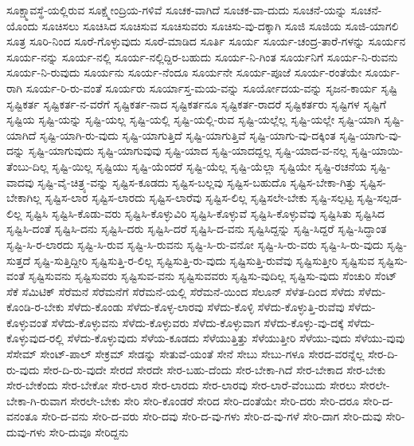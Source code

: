 {ಸೂಕ್ಷ್ಮಾವಸ್ಥೆ-ಯಲ್ಲಿರುವ
ಸೂಕ್ಷ್ಮೇಂದ್ರಿಯ-ಗಳಿವೆ
ಸೂಚಕ-ವಾಗಿದೆ
ಸೂಚಕ-ವಾ-ದುದು
ಸೂಚನೆ-ಯನ್ನು
ಸೂಚನೆ-ಯೊಂದು
ಸೂಚಿಸಲು
ಸೂಚಿಸಿದ
ಸೂಚಿಸುವ
ಸೂಚಿಸುವರು
ಸೂಚಿಸು-ವು-ದಕ್ಕಾಗಿ
ಸೂಜಿ
ಸೂಜಿಯ
ಸೂಜಿ-ಯಾಗಲಿ
ಸೂತ್ರ
ಸೂರಿ-ನಿಂದ
ಸೂರೆ-ಗೊಳ್ಳುವುದು
ಸೂರೆ-ಮಾಡಿದ
ಸೂರ್ತಿ
ಸೂರ್ಯ
ಸೂರ್ಯ-ಚಂದ್ರ-ತಾರೆ-ಗಳನ್ನು
ಸೂರ್ಯನ
ಸೂರ್ಯ-ನನ್ನು
ಸೂರ್ಯ-ನಲ್ಲಿ
ಸೂರ್ಯ-ನಲ್ಲಿದ್ದಿರ-ಬಹುದು
ಸೂರ್ಯ-ನಿ-ಗಿಂತ
ಸೂರ್ಯನಿಗೆ
ಸೂರ್ಯ-ನಿ-ರುವನು
ಸೂರ್ಯ-ನಿ-ರುವುದು
ಸೂರ್ಯನು
ಸೂರ್ಯ-ನೆಂದೂ
ಸೂರ್ಯನೇ
ಸೂರ್ಯ-ಪೂಜೆ
ಸೂರ್ಯ-ರಂತೆಯೇ
ಸೂರ್ಯ-ರಾಗಿ
ಸೂರ್ಯ-ರಿ-ರು-ವಂತೆ
ಸೂರ್ಯರು
ಸೂರ್ಯಾಸ್ತ-ಮಯ-ವನ್ನು
ಸೂರ್ಯೋದಯ-ವನ್ನು
ಸೃಜನ-ಕಾರ್ಯ
ಸೃಷ್ಟಿ
ಸೃಷ್ಟಿಕರ್ತ
ಸೃಷ್ಟಿಕರ್ತ-ನ-ವರೆಗೆ
ಸೃಷ್ಟಿಕರ್ತ-ನಾದ
ಸೃಷ್ಟಿಕರ್ತನೂ
ಸೃಷ್ಟಿಕರ್ತ-ರಾದರೆ
ಸೃಷ್ಟಿಕರ್ತರು
ಸೃಷ್ಟಿಗಳ
ಸೃಷ್ಟಿಗೆ
ಸೃಷ್ಟಿಯ
ಸೃಷ್ಟಿ-ಯನ್ನು
ಸೃಷ್ಟಿ-ಯಲ್ಲ
ಸೃಷ್ಟಿ-ಯಲ್ಲಿ
ಸೃಷ್ಟಿ-ಯಲ್ಲಿ-ರುವ
ಸೃಷ್ಟಿ-ಯಲ್ಲೆಲ್ಲ
ಸೃಷ್ಟಿ-ಯಲ್ಲೇ
ಸೃಷ್ಟಿ-ಯಾಗಿ
ಸೃಷ್ಟಿ-ಯಾಗಿದೆ
ಸೃಷ್ಟಿ-ಯಾಗಿ-ರು-ವುದು
ಸೃಷ್ಟಿ-ಯಾಗುತ್ತಿದೆ
ಸೃಷ್ಟಿ-ಯಾಗುತ್ತಿವೆ
ಸೃಷ್ಟಿ-ಯಾಗು-ವು-ದಕ್ಕಿಂತ
ಸೃಷ್ಟಿ-ಯಾಗು-ವು-ದನ್ನು
ಸೃಷ್ಟಿ-ಯಾಗುವುದು
ಸೃಷ್ಟಿ-ಯಾಗುವುವು
ಸೃಷ್ಟಿ-ಯಾದ
ಸೃಷ್ಟಿ-ಯಾದದ್ದಲ್ಲ
ಸೃಷ್ಟಿ-ಯಾದ-ವ-ನಲ್ಲ
ಸೃಷ್ಟಿ-ಯಾಯಿ-ತೆಂಬು-ದಿಲ್ಲ
ಸೃಷ್ಟಿ-ಯಿಲ್ಲ
ಸೃಷ್ಟಿಯು
ಸೃಷ್ಟಿ-ಯೆಂದರೆ
ಸೃಷ್ಟಿ-ಯೆಲ್ಲ
ಸೃಷ್ಟಿ-ಯೆಲ್ಲಾ
ಸೃಷ್ಟಿಯೇ
ಸೃಷ್ಟಿ-ರಚನೆಯ
ಸೃಷ್ಟಿ-ವಾದವು
ಸೃಷ್ಟಿ-ವೈ-ಚಿತ್ರ್ಯ-ವನ್ನು
ಸೃಷ್ಟಿಸ-ಕೂಡದು
ಸೃಷ್ಟಿಸ-ಬಲ್ಲವು
ಸೃಷ್ಟಿಸ-ಬಹುದೊ
ಸೃಷ್ಟಿಸ-ಬೇಕಾ-ಗಿತ್ತು
ಸೃಷ್ಟಿಸ-ಬೇಕಾಗಿಲ್ಲ
ಸೃಷ್ಟಿಸ-ಲಾರ
ಸೃಷ್ಟಿಸ-ಲಾರದು
ಸೃಷ್ಟಿಸ-ಲಾರೆವು
ಸೃಷ್ಟಿಸ-ಲಿಲ್ಲ
ಸೃಷ್ಟಿಸಲೇ-ಬೇಕು
ಸೃಷ್ಟಿ-ಸಲ್ಪಟ್ಟ
ಸೃಷ್ಟಿ-ಸಲ್ಪಡ-ಲಿಲ್ಲ
ಸೃಷ್ಟಿಸಿ
ಸೃಷ್ಟಿಸಿ-ಕೊಡು-ವರು
ಸೃಷ್ಟಿಸಿ-ಕೊಳ್ಳುವಿರಿ
ಸೃಷ್ಟಿಸಿ-ಕೊಳ್ಳುವೆ
ಸೃಷ್ಟಿಸಿ-ಕೊಳ್ಳುವೆವು
ಸೃಷ್ಟಿಸಿತು
ಸೃಷ್ಟಿಸಿದ
ಸೃಷ್ಟಿಸಿ-ದಂತೆ
ಸೃಷ್ಟಿಸಿ-ದನು
ಸೃಷ್ಟಿಸಿ-ದರು
ಸೃಷ್ಟಿಸಿ-ದರೆ
ಸೃಷ್ಟಿಸಿ-ದ-ವನು
ಸೃಷ್ಟಿಸಿದ್ದನ್ನು
ಸೃಷ್ಟಿ-ಸಿದ್ದರೆ
ಸೃಷ್ಟಿ-ಸಿದ್ಧಾಂತ
ಸೃಷ್ಟಿ-ಸಿ-ರ-ಲಾರದು
ಸೃಷ್ಟಿ-ಸಿ-ರುವ
ಸೃಷ್ಟಿ-ಸಿ-ರುವನು
ಸೃಷ್ಟಿ-ಸಿ-ರು-ವನೋ
ಸೃಷ್ಟಿ-ಸಿ-ರು-ವರು
ಸೃಷ್ಟಿ-ಸಿ-ರು-ವುದು
ಸೃಷ್ಟಿ-ಸುತ್ತದೆ
ಸೃಷ್ಟಿ-ಸುತ್ತಿದ್ದೀರಿ
ಸೃಷ್ಟಿಸುತ್ತಿ-ರ-ಲಿಲ್ಲ
ಸೃಷ್ಟಿಸುತ್ತಿ-ರು-ವುದು
ಸೃಷ್ಟಿಸುತ್ತಿ-ರುವೆವು
ಸೃಷ್ಟಿಸುತ್ತೀರಿ
ಸೃಷ್ಟಿಸುವ
ಸೃಷ್ಟಿಸು-ವಂತೆ
ಸೃಷ್ಟಿಸುವನು
ಸೃಷ್ಟಿಸುವರು
ಸೃಷ್ಟಿಸುವ-ವನು
ಸೃಷ್ಟಿಸುವವರು
ಸೃಷ್ಟಿಸು-ವುದಿಲ್ಲ
ಸೃಷ್ಟಿಸು-ವುದು
ಸೆಂಚುರಿ
ಸೆಂಟ್
ಸೆಕೆ
ಸೆಮಿಟಿಕ್
ಸೆರೆಮನೆ
ಸೆರೆಮನೆಗೆ
ಸೆರೆಮನೆ-ಯಲ್ಲಿ
ಸೆರೆಮನೆ-ಯಿಂದ
ಸೆಲೂನ್
ಸೆಳೆತ-ದಿಂದ
ಸೆಳೆದು
ಸೆಳೆದು-ಕೊಂಡಿ-ರ-ಬೇಕು
ಸೆಳೆದು-ಕೊಂಡು
ಸೆಳೆದು-ಕೊಳ್ಳ-ಲಾರವು
ಸೆಳೆದು-ಕೊಳ್ಳಿ
ಸೆಳೆದು-ಕೊಳ್ಳುತ್ತಿ-ರುವೆವು
ಸೆಳೆದು-ಕೊಳ್ಳುವಂತೆ
ಸೆಳೆದು-ಕೊಳ್ಳುವನು
ಸೆಳೆದು-ಕೊಳ್ಳುವರು
ಸೆಳೆದು-ಕೊಳ್ಳುವಾಗ
ಸೆಳೆದು-ಕೊಳ್ಳು-ವು-ದಕ್ಕೆ
ಸೆಳೆದು-ಕೊಳ್ಳುವುದ-ರಲ್ಲಿ
ಸೆಳೆದು-ಕೊಳ್ಳುವುದು
ಸೆಳೆಯ-ಕೂಡದು
ಸೆಳೆಯುತ್ತಿತ್ತು
ಸೆಳೆಯುತ್ತೀರಿ
ಸೆಳೆಯು-ವುದು
ಸೆಳೆಯು-ವುವು
ಸೆಸೇಮ್
ಸೇಂಟ್-ಪಾಲ್
ಸೇಕ್ರಮ್
ಸೇಡನ್ನು
ಸೇತುವೆ-ಯಂತೆ
ಸೇನೆ
ಸೇಬು
ಸೇಬು-ಗಳೂ
ಸೇರದ-ವರನ್ನೆಲ್ಲ
ಸೇರ-ದಿ-ರು-ವುದು
ಸೇರ-ದಿ-ರು-ವುದೇ
ಸೇರದೆ
ಸೇರದೇ
ಸೇರ-ಬಹು-ದೆಂದು
ಸೇರ-ಬೇಕಾ-ಗಿದೆ
ಸೇರ-ಬೇಕಾದ
ಸೇರ-ಬೇಕು
ಸೇರ-ಬೇಕೆಂದು
ಸೇರ-ಬೇಕೋ
ಸೇರ-ಲಾರ
ಸೇರ-ಲಾರದು
ಸೇರ-ಲಾರವು
ಸೇರ-ಲಾರೆ-ವೆಂಬುದು
ಸೇರಲು
ಸೇರಲೇ-ಬೇಕಾ-ಗಿ-ರುವಾಗ
ಸೇರಲೇ-ಬೇಕು
ಸೇರಿ
ಸೇರಿ-ಕೊಂಡರೆ
ಸೇರಿದ
ಸೇರಿ-ದಂತೆಯೇ
ಸೇರಿ-ದರು
ಸೇರಿ-ದರೂ
ಸೇರಿ-ದ-ವನಂತೂ
ಸೇರಿ-ದ-ವನು
ಸೇರಿ-ದ-ವರು
ಸೇರಿ-ದವು
ಸೇರಿ-ದ-ವು-ಗಳು
ಸೇರಿ-ದ-ವು-ಗಳೆ
ಸೇರಿ-ದಾಗ
ಸೇರಿ-ದುವು
ಸೇರಿ-ದುವು-ಗಳು
ಸೇರಿ-ದುವೂ
ಸೇರಿದ್ದನು
}
